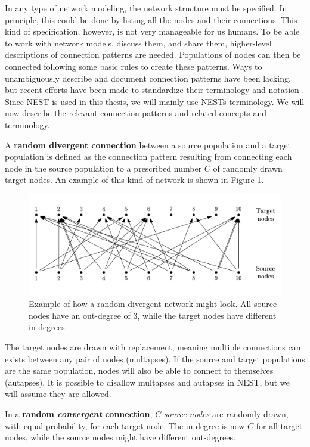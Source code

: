 In any type of network modeling, the network structure must be specified. In principle, this could be done by listing all the nodes and their connections. This kind of specification, however, is not very manageable for us humans. To be able to work with network models, discuss them, and share them, higher-level descriptions of connection patterns are needed. Populations of nodes can then be connected following some basic rules to create these patterns. Ways to unambiguously describe and document connection patterns have been lacking, but recent efforts have been made to standardize their terminology and notation . Since NEST is used in this thesis, we will mainly use NESTs terminology. We will now describe the relevant connection patterns and related concepts and terminology. 

A {\bf random divergent connection} between a source population and a target population is defined as the connection pattern resulting from connecting each node in the source population to a prescribed number $C$ of randomly drawn target nodes. An example of this kind of network is shown in Figure \ref{fig:rdc_example_intro}.
\begin{figure}[b]
  \centering
  \includegraphics[width=\textwidth]{RandDivConn.pdf}
  \caption[A random divergent connection pattern]{Example of how a random divergent network might look. All source nodes have an out-degree of 3, while the target nodes have different in-degrees.}
  \label{fig:rdc_example_intro}
\end{figure}
The target nodes are drawn with replacement, meaning multiple connections can exists between any pair of nodes (multapses). If the source and target populations are the same population, nodes will also be able to connect to themselves (autapses). It is possible to disallow multapses and autapses in NEST, but we will assume they are allowed. 

In a {\bf random \emph{convergent} connection}, $C$ \emph{source nodes} are randomly drawn, with equal probability, for each target node. The in-degree is now $C$ for all target nodes, while the source nodes might have different out-degrees.

